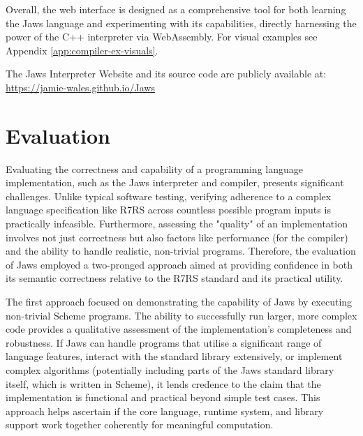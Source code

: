 \documentclass[final]{cmpreport_02}
\begin{document}
Overall, the web interface is designed as a comprehensive tool for both learning the Jaws language and experimenting with its capabilities, directly harnessing the power of the C++ interpreter via WebAssembly. For visual examples see Appendix \ref{app:compiler-ex-visuals}.\newline

The Jaws Interpreter Website and its source code are publicly available at: \url{https://jamie-wales.github.io/Jaws}



\section{Evaluation} %

Evaluating the correctness and capability of a programming language implementation, such as the Jaws interpreter and compiler, presents significant challenges. Unlike typical software testing, verifying adherence to a complex language specification like R7RS across countless possible program inputs is practically infeasible. Furthermore, assessing the "quality" of an implementation involves not just correctness but also factors like performance (for the compiler) and the ability to handle realistic, non-trivial programs. Therefore, the evaluation of Jaws employed a two-pronged approach aimed at providing confidence in both its semantic correctness relative to the R7RS standard and its practical utility.\newline

The first approach focused on demonstrating the capability of Jaws by executing non-trivial Scheme programs. The ability to successfully run larger, more complex code provides a qualitative assessment of the implementation's completeness and robustness. If Jaws can handle programs that utilise a significant range of language features, interact with the standard library extensively, or implement complex algorithms (potentially including parts of the Jaws standard library itself, which is written in Scheme), it lends credence to the claim that the implementation is functional and practical beyond simple test cases. This approach helps ascertain if the core language, runtime system, and library support work together coherently for meaningful computation.\newline
\end{document}
